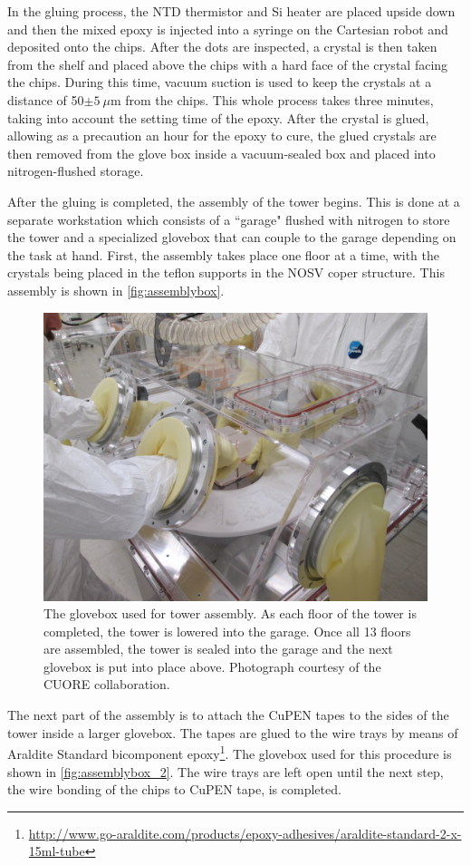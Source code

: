 In the gluing process, the NTD thermistor and Si heater are placed upside down and then the mixed epoxy is injected into a syringe on the Cartesian robot and deposited onto the chips.
After the dots are inspected, a crystal is then taken from the shelf and placed above the chips with a hard face of the crystal facing the chips.
During this time, vacuum suction is used to keep the crystals at a distance of 50$\pm 5~\mu$m from the chips.
This whole process takes three minutes, taking into account the setting time of the epoxy.
After the crystal is glued, allowing as a precaution an hour for the epoxy to cure, the glued crystals are then removed from the glove box inside a vacuum-sealed box and placed into nitrogen-flushed storage.

After the gluing is completed, the assembly of the tower begins.
This is done at a separate workstation which consists of a ``garage" flushed with nitrogen to store the tower and a specialized glovebox that can couple to the garage depending on the task at hand.
First, the assembly takes place one floor at a time, with the crystals being placed in the teflon supports in the NOSV coper structure.
This assembly is shown in \autoref{fig:assemblybox}.

\begin{figure}[htbp]
    \centering
    \includegraphics[width=0.6\linewidth]{Figures/TowerAssemblyBox.jpg}
    \caption[The glovebox used for tower assembly.]
    {The glovebox used for tower assembly.
    As each floor of the tower is completed, the tower is lowered into the garage.
    Once all 13 floors are assembled, the tower is sealed into the garage and the next glovebox is put into place above.
    Photograph courtesy of the CUORE collaboration.}
    \label{fig:assemblybox}
\end{figure}

The next part of the assembly is to attach the CuPEN tapes to the sides of the tower inside a larger glovebox.
The tapes are glued to the wire trays by means of Araldite Standard bicomponent epoxy\footnote{\RaggedRight\url{http://www.go-araldite.com/products/epoxy-adhesives/araldite-standard-2-x-15ml-tube}}.
The glovebox used for this procedure is shown in \autoref{fig:assemblybox_2}.
The wire trays are left open until the next step, the wire bonding of the chips to CuPEN tape, is completed.


